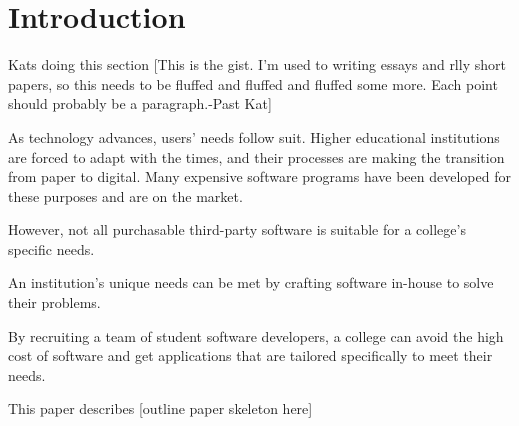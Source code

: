\section{Introduction}
Kats doing this section
[This is the gist. I'm used to writing essays and rlly short papers, so this needs to be fluffed and fluffed and fluffed some more. Each point should probably be a paragraph.-Past Kat]

As technology advances, users' needs follow suit. Higher educational institutions are forced to adapt with the times, and their processes are making the transition from paper to digital. Many expensive software programs have been developed for these purposes and are on the market. 

However, not all purchasable third-party software is suitable for a college's specific needs. 

An institution's unique needs can be met by crafting software in-house to solve their problems. 

By recruiting a team of student software developers, a college can avoid the high cost of software and get applications that are tailored specifically to meet their needs.

This paper describes [outline paper skeleton here]

